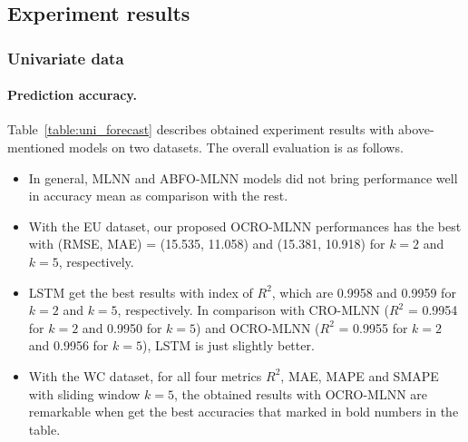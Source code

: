 \documentclass[smallcondensed, natbib]{svjour3}     %
\begin{document}
\subsection{Experiment results}
\label{results_discussion}

\subsubsection{Univariate data}
\paragraph{\textbf{Prediction accuracy.}} Table~\ref{table:uni_forecast} describes obtained experiment results with above-mentioned models on two datasets. The overall evaluation is as follows.

\begin{itemize}
	\item In general, MLNN and ABFO-MLNN models did not bring performance well in accuracy mean as comparison with the rest. 
	\item With the EU dataset, our proposed OCRO-MLNN performances has the best with (RMSE, MAE) = (15.535, 11.058) and (15.381, 10.918) for $k = 2$ and $k = 5$, respectively. 	
	\item LSTM get the best results with index of $R^{2}$, which are 0.9958 and 0.9959 for $k = 2$ and $k = 5$, respectively. In comparison with CRO-MLNN ($R^{2}$ = 0.9954 for $k = 2$ and 0.9950 for $k = 5$) and OCRO-MLNN ($R^2$ = 0.9955 for $k = 2$ and 0.9956 for $k = 5$), LSTM is just slightly better. 
	\item With the WC dataset, for all four metrics $R^2$, MAE, MAPE and SMAPE with sliding window $k = 5$, the obtained results with OCRO-MLNN are remarkable when get the best accuracies that marked in bold numbers in the table. 
\end{itemize}


\end{document}
